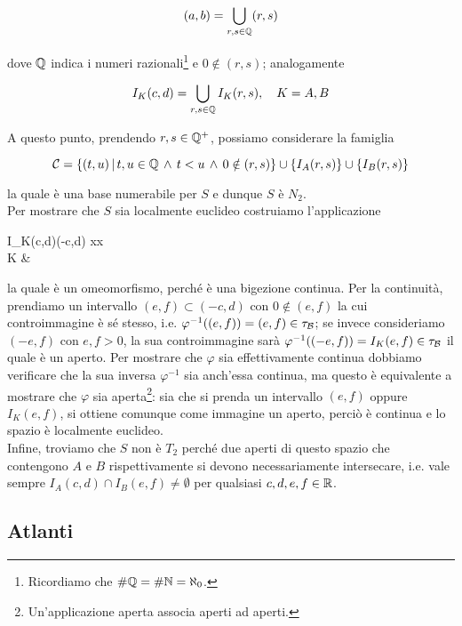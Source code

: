\begin{equation}
	(a,b) = \bigcup_{r,s \in \mathbb{Q}} (r,s)
\end{equation}

dove $ \mathbb{Q} $ indica i numeri razionali\footnote{%
	Ricordiamo che $ \# \mathbb{Q} = \# \mathbb{N} = \aleph_{0} $.%
} e $ 0 \notin (r,s) $; analogamente

\begin{equation}
	I_{K}(c,d) = \bigcup_{r,s \in \Q} I_{K}(r,s) \qcomma K = A, B
\end{equation}

A questo punto, prendendo $ r, s \in \mathbb{Q}^{+} $, possiamo considerare la famiglia

\begin{equation}
	\mathcal{C} = \left\{ (t,u) \, \middle| \, t,u \in \mathbb{Q} \, \wedge \, t < u \, \wedge \, 0 \notin (r,s) \right\} \cup \left\{ I_{A}(r,s) \right\} \cup \left\{ I_{B}(r,s) \right\}
\end{equation}

la quale è una base numerabile per $ S $ e dunque $ S $ è $ N_{2} $. \\
Per mostrare che $ S $ sia localmente euclideo costruiamo l'applicazione

\map{\varphi}
	{I_{K}(c,d)}{(-c,d) \subset \R}
	{x}{x \\
	K &}

la quale è un omeomorfismo, perché è una bigezione continua. Per la continuità, prendiamo un intervallo $ (e,f) \subset (-c,d) $ con $ 0 \notin (e,f) $ la cui controimmagine è sé stesso, i.e. $ \varphi^{-1}((e,f)) = (e,f) \in \tau_{\mathcal{B}} $; se invece consideriamo $ (-e,f) $ con $ e,f>0 $, la sua controimmagine sarà $ \varphi^{-1}((-e,f)) = I_{K}(e,f) \in \tau_{\mathcal{B}} $ il quale è un aperto. Per mostrare che $ \varphi $ sia effettivamente continua dobbiamo verificare che la sua inversa $ \varphi^{-1} $ sia anch'essa continua, ma questo è equivalente a mostrare che $ \varphi $ sia aperta\footnote{%
	Un'applicazione aperta associa aperti ad aperti.%
}: sia che si prenda un intervallo $ (e,f) $ oppure $ I_{K}(e,f) $, si ottiene comunque come immagine un aperto, perciò è continua e lo spazio è localmente euclideo. \\
Infine, troviamo che $ S $ non è $ T_{2} $ perché due aperti di questo spazio che contengono $ A $ e $ B $ rispettivamente si devono necessariamente intersecare, i.e. vale sempre $ I_{A}(c,d) \cap I_{B}(e,f) \neq \emptyset $ per qualsiasi $ c, d, e, f \in \mathbb{R} $.

\subsection{Atlanti}


